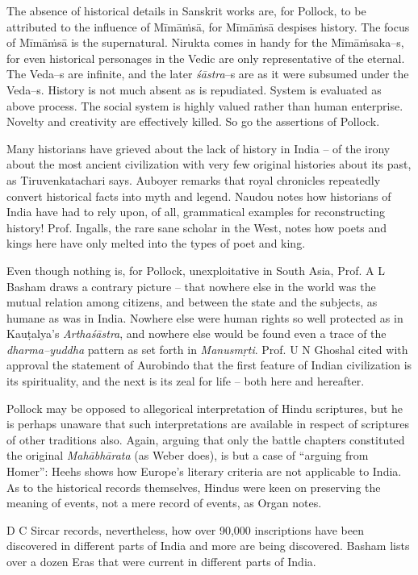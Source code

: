 The absence of historical details in Sanskrit works are, for Pollock, to be attributed to the influence of Mīmāṁsā, for Mīmāṁsā despises history. The focus of Mīmāṁsā is the supernatural. Nirukta comes in handy for the Mīmāṁsaka–s, for even historical personages in the Vedic are only representative of the eternal. The Veda–s are infinite, and the later \textit{śāstra}–s are as it were subsumed under the Veda–s. History is not much absent as is repudiated. System is evaluated as above process. The social system is highly valued rather than human enterprise. Novelty and creativity are effectively killed. So go the assertions of Pollock.

Many historians have grieved about the lack of history in India – of the irony about the most ancient civilization with very few original histories about its past, as Tiruvenkatachari says. Auboyer remarks that royal chronicles repeatedly convert historical facts into myth and legend. Naudou notes how historians of India have had to rely upon, of all, grammatical examples for reconstructing history! Prof. Ingalls, the rare sane scholar in the West, notes how poets and kings here have only melted into the types of poet and king.

Even though nothing is, for Pollock, unexploitative in South Asia, Prof. A L Basham draws a contrary picture – that nowhere else in the world was the mutual relation among citizens, and between the state and the subjects, as humane as was in India. Nowhere else were human rights so well protected as in Kauṭalya’s \textit{Arthaśāstra}, and nowhere else would be found even a trace of the \textit{dharma–yuddha} pattern as set forth in \textit{Manusmṛti}. Prof. U N Ghoshal cited with approval the statement of Aurobindo that the first feature of Indian civilization is its spirituality, and the next is its zeal for life – both here and hereafter.

Pollock may be opposed to allegorical interpretation of Hindu scriptures, but he is perhaps unaware that such interpretations are available in respect of scriptures of other traditions also. Again, arguing that only the battle chapters constituted the original \textit{Mahābhārata} (as Weber does), is but a case of “arguing from Homer”: Heehs shows how Europe’s literary criteria are not applicable to India. As to the historical records themselves, Hindus were keen on preserving the meaning of events, not a mere record of events, as Organ notes.

D C Sircar records, nevertheless, how over 90,000 inscriptions have been discovered in different parts of India and more are being discovered. Basham lists over a dozen Eras that were current in different parts of India.

